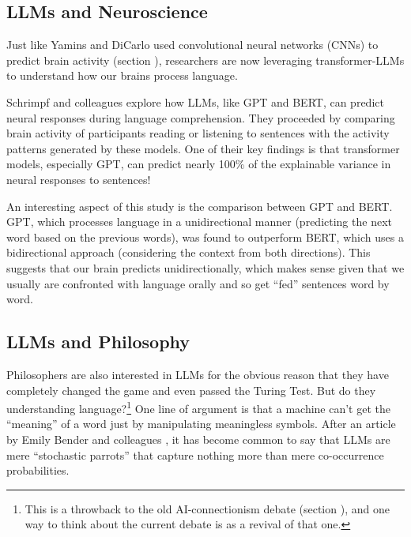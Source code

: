\subsection{LLMs and Neuroscience}

Just like Yamins and DiCarlo used convolutional neural networks (CNNs) to predict brain activity (section ), researchers are now leveraging transformer-LLMs to understand how our brains process language. 

Schrimpf and colleagues \cite{schrimpf2021neural} explore how LLMs, like GPT and BERT, can predict neural responses during language comprehension. They proceeded by comparing  brain activity of participants reading or listening to sentences with the activity patterns generated by these models. One of their key findings is that transformer models, especially GPT, can predict nearly 100\% of the explainable variance in neural responses to sentences! 

An interesting aspect of this study is the comparison between GPT and BERT. GPT, which processes language in a unidirectional manner (predicting the next word based on the previous words), was found to outperform BERT, which uses a bidirectional approach (considering the context from both directions). This suggests that our brain predicts unidirectionally, which  makes sense given that we usually are confronted with language orally and so get ``fed'' sentences word by word. 


\subsection{LLMs and Philosophy}\label{llmPhilosophy}

Philosophers are also interested in LLMs for the obvious reason that they have completely changed the game and even passed the Turing Test. But do they understanding language?\footnote{This is a throwback to the old AI-connectionism debate (section ), and one way to think about the current debate is as a revival of that one.} One line of argument is that a machine can’t get the ``meaning'' of a word just by manipulating meaningless symbols. After an article by Emily Bender and colleagues \cite{bender2021dangers}, it has become common to say that LLMs are mere ``stochastic parrots'' that capture nothing more than mere co-occurrence probabilities. 

